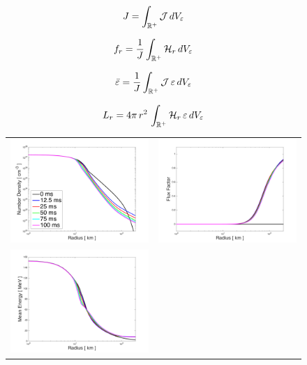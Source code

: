 \documentclass[10pt,preprint]{aastex}
\begin{document}
\begin{equation}
  J=\int_{\mathbb{R}^{+}}\mathcal{J}\,dV_{\varepsilon}
\end{equation}

\begin{equation}
  f_{r}=\frac{1}{J}\int_{\mathbb{R}^{+}}\mathcal{H}_{r}\,dV_{\varepsilon}
\end{equation}

\begin{equation}
  \bar{\varepsilon}=\frac{1}{J}\int_{\mathbb{R}^{+}}\mathcal{J}\,\varepsilon\,dV_{\varepsilon}
\end{equation}

\begin{equation}
  L_{r}=4\pi\,r^{2}\,\int_{\mathbb{R}^{+}}\mathcal{H}_{r}\,\varepsilon\,dV_{\varepsilon}
\end{equation}

\begin{figure}
  \begin{center}
    \begin{tabular}{cc}
      \includegraphics[width=.475\textwidth]{./Figures/DeleptonizationProblem1D_NumberDensity.png} &
      \includegraphics[width=.475\textwidth]{./Figures/DeleptonizationProblem1D_FluxFactor.png} \\
      \includegraphics[width=.475\textwidth]{./Figures/DeleptonizationProblem1D_MeanEnergy.png} &

\end{tabular}
\end{center}
\end{figure}
\end{document}
